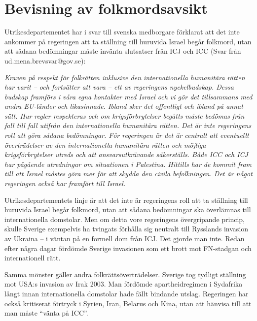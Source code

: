 


\section{Bevisning av folkmordsavsikt}


Utrikesdepartementet har i svar till svenska medborgare förklarat att det inte ankommer på regeringen 
att ta ställning till huruvida Israel begår folkmord, utan att sådana bedömningar måste invänta slutsatser 
från ICJ och ICC (Svar från ud.mena.brevsvar@gov.se):

\textit{Kraven på respekt för folkrätten inklusive den internationella humanitära rätten har varit – och fortsätter att vara – ett av regeringens nyckelbudskap. Dessa budskap framförs i våra egna kontakter med Israel och vi gör det tillsammans med andra EU-länder och likasinnade. Ibland sker det offentligt och ibland på annat sätt. Hur regler respekteras och om krigsförbrytelser begåtts måste bedömas från fall till fall utifrån den internationella humanitära rätten. Det är inte regeringens roll att göra sådana bedömningar. För regeringen är det är centralt att eventuellt överträdelser av den internationella humanitära rätten och möjliga krigsförbrytelser utreds och att ansvarsutkrävande säkerställs. Både ICC och ICJ har pågående utredningar om situationen i Palestina. Hittills har de kommit fram till att Israel måstes göra mer för att skydda den civila befolkningen. Det är något regeringen också har framfört till Israel.}



Utrikesdepartementets linje är att det inte är regeringens roll att ta ställning till huruvida Israel begår folkmord, utan att sådana bedömningar ska överlämnas till internationella domstolar. Men om detta vore regeringens övergripande princip, skulle Sverige exempelvis ha tvingats förhålla sig neutralt till Rysslands invasion av Ukraina – i väntan på en formell dom från ICJ. Det gjorde man inte. Redan efter några dagar fördömde Sverige invasionen som ett brott mot FN-stadgan och internationell rätt.  

Samma mönster gäller andra folkrättsöverträdelser. Sverige tog tydligt ställning mot USA:s invasion av Irak 2003. Man fördömde apartheidregimen i Sydafrika långt innan internationella domstolar hade fällt bindande utslag. Regeringen har också kritiserat förtryck i Syrien, Iran, Belarus och Kina, utan att hänvisa till att man måste “vänta på ICC”.

